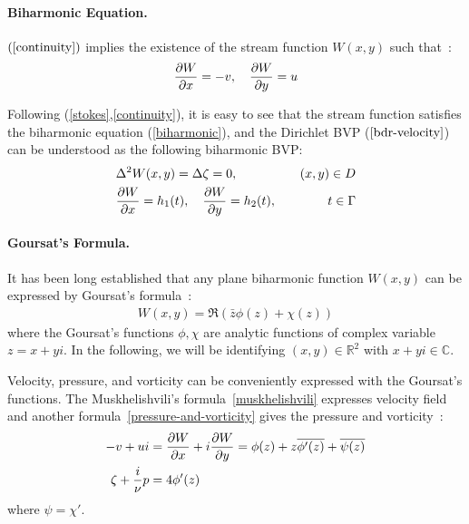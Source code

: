 \documentclass[10pt,twocolumn,letterpaper]{article}
\begin{document}
\paragraph*{Biharmonic Equation.} $(\ref{continuity})$ implies the existence of the
stream function $W(x,y)$ such that~\cite{greengardIntegralEquationMethods1996}:
\begin{align}
  \pdv{W}{x} = -v,\quad \pdv{W}{y} = u \label{stream-1}
\end{align}

Following (\ref{stokes},\ref{continuity}), it is easy to see that the stream
function satisfies the biharmonic equation (\ref{biharmonic}), and the
Dirichlet BVP ($\ref{bdr-velocity}$) can be understood as the following
biharmonic BVP:
\begin{align}
   & \Delta^2 W(x,y) = \Delta \zeta = 0,                        & (x,y)\in D \label{biharmonic} \\
   & \pdv{W}{x}(t) = h_1(t),\quad \pdv{W}{y}(t) = h_2(t), \quad & t\in \Gamma\label{bih-bv}
\end{align}

\paragraph*{Goursat's Formula.} It has been long established that any plane
biharmonic function $W(x,y)$ can be expressed by Goursat's formula~\cite{muskhelishviliBasicProblemsMathematical1977}:
\begin{align}
  W(x,y) = \Re (\bar z \phi(z) + \chi (z)) \label{Goursat}
\end{align}
where the Goursat's functions $\phi, \chi$ are analytic functions of complex variable $z = x+yi$.
In the following, we will be identifying $(x,y) \in \mathbb{R}^2$ with $x + yi \in \mathbb{C}$.

Velocity, pressure, and vorticity can be conveniently expressed with the
Goursat's functions. The Muskhelishvili's formula~\eqref{muskhelishvili}
expresses velocity field and another formula~\eqref{pressure-and-vorticity}
gives the pressure and vorticity~\cite{muskhelishviliBasicProblemsMathematical1977}:
\begin{align}
  -v + ui                & = \pdv{W}{x} + i\pdv{W}{y}
  = \phi(z) + z \overline{\phi'(z)} + \overline{\psi(z)}
  \label{muskhelishvili}                                              \\
  \zeta + \frac{i}{\nu}p & = 4\phi'(z) \label{pressure-and-vorticity}
\end{align} where $\psi = \chi'$.
\end{document}
